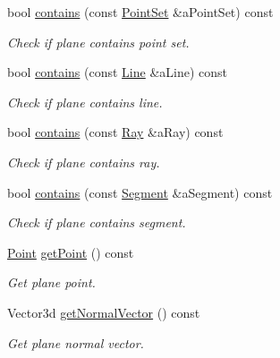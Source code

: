 \begin{DoxyCompactItemize}
bool \hyperlink{classlibrary_1_1math_1_1geom_1_1d3_1_1objects_1_1_plane_ab3dda718ba2d7f5e88c684fc32f0c741}{contains} (const \hyperlink{classlibrary_1_1math_1_1geom_1_1d3_1_1objects_1_1_point_set}{Point\+Set} \&a\+Point\+Set) const
\begin{DoxyCompactList}\small\item\em Check if plane contains point set. \end{DoxyCompactList}\item 
bool \hyperlink{classlibrary_1_1math_1_1geom_1_1d3_1_1objects_1_1_plane_a163c79cd6e5ece9048fff99d42168c6b}{contains} (const \hyperlink{classlibrary_1_1math_1_1geom_1_1d3_1_1objects_1_1_line}{Line} \&a\+Line) const
\begin{DoxyCompactList}\small\item\em Check if plane contains line. \end{DoxyCompactList}\item 
bool \hyperlink{classlibrary_1_1math_1_1geom_1_1d3_1_1objects_1_1_plane_a35e77c2b5c77b2d1b640865cf374d94c}{contains} (const \hyperlink{classlibrary_1_1math_1_1geom_1_1d3_1_1objects_1_1_ray}{Ray} \&a\+Ray) const
\begin{DoxyCompactList}\small\item\em Check if plane contains ray. \end{DoxyCompactList}\item 
bool \hyperlink{classlibrary_1_1math_1_1geom_1_1d3_1_1objects_1_1_plane_adb47fb2fb464a38e143f35da9122e64a}{contains} (const \hyperlink{classlibrary_1_1math_1_1geom_1_1d3_1_1objects_1_1_segment}{Segment} \&a\+Segment) const
\begin{DoxyCompactList}\small\item\em Check if plane contains segment. \end{DoxyCompactList}\item 
\hyperlink{classlibrary_1_1math_1_1geom_1_1d3_1_1objects_1_1_point}{Point} \hyperlink{classlibrary_1_1math_1_1geom_1_1d3_1_1objects_1_1_plane_a52f9167ca123019c4b303c19b696b886}{get\+Point} () const
\begin{DoxyCompactList}\small\item\em Get plane point. \end{DoxyCompactList}\item 
Vector3d \hyperlink{classlibrary_1_1math_1_1geom_1_1d3_1_1objects_1_1_plane_a9d34608a389d4c80dad6b6f58b82c0e4}{get\+Normal\+Vector} () const
\begin{DoxyCompactList}\small\item\em Get plane normal vector. \end{DoxyCompactList}\item 

\end{DoxyCompactItemize}
